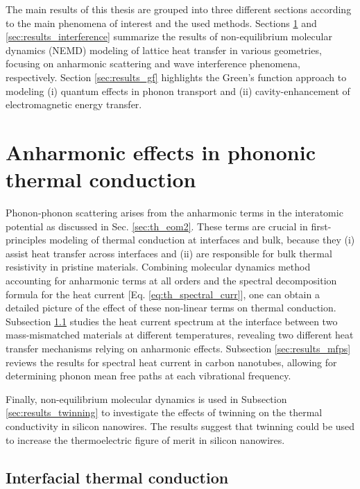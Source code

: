 
\label{chap:results}

The main results of this thesis are grouped into three different sections according to the main phenomena of interest and the used methods. Sections \ref{sec:results_anharm} and \ref{sec:results_interference} summarize the results of non-equilibrium molecular dynamics (NEMD) modeling of lattice heat transfer in various geometries, focusing on anharmonic scattering and wave interference phenomena, respectively. Section \ref{sec:results_gf} highlights the Green's function approach to modeling (i) quantum effects in phonon transport and (ii) cavity-enhancement of electromagnetic energy transfer.


\section{Anharmonic effects in phononic thermal conduction}
\label{sec:results_anharm}

Phonon-phonon scattering arises from the anharmonic terms in the interatomic potential as discussed in Sec. \ref{sec:th_eom2}. These terms are crucial in first-principles modeling of thermal conduction at interfaces and bulk, because they (i) assist heat transfer across interfaces \cite{} and (ii) are responsible for bulk thermal resistivity in pristine materials. Combining molecular dynamics method accounting for anharmonic terms at all orders and the spectral decomposition formula for the heat current [Eq. \eqref{eq:th_spectral_curr}], one can obtain a detailed picture of the effect of these non-linear terms on thermal conduction. Subsection \ref{sec:results_interface} studies the heat current spectrum at the interface between two mass-mismatched materials at different temperatures, revealing two different heat transfer mechanisms relying on anharmonic effects. Subsection \ref{sec:results_mfps} reviews the results for spectral heat current in carbon nanotubes, allowing for determining phonon mean free paths at each vibrational frequency. 

Finally, non-equilibrium molecular dynamics is used in Subsection \ref{sec:results_twinning} to investigate the effects of twinning on the thermal conductivity in silicon nanowires. The results suggest that twinning could be used to increase the thermoelectric figure of merit in silicon nanowires. 

\subsection{Interfacial thermal conduction}
\label{sec:results_interface}

